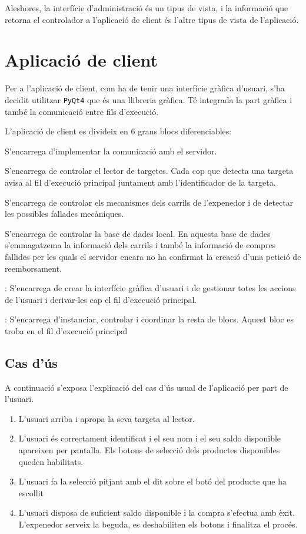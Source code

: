 Aleshores, la interfície d'administració és un tipus de vista, i la informació que retorna el controlador a l'aplicació de client és l'altre tipus de vista de l'aplicació.

\section{Aplicació de client}
Per a l'aplicació de client, com ha de tenir una interfície gràfica d'usuari, s'ha decidit utilitzar \texttt{PyQt4} que és una llibreria gràfica. Té integrada la part gràfica i també la comunicació entre fils d'execució.

L'aplicació de client es divideix en 6 grans blocs diferenciables:
\begin{description}[font=\normalfont\textbf]\itemsep2pt 
\vspace{-1em}
\parskip1pt 
\item[comms] S'encarrega d'implementar la comunicació amb el servidor.
\item[card\_reader] S'encarrega de controlar el lector de targetes. Cada cop que detecta una targeta avisa al fil d'execució principal juntament amb l'identificador de la targeta.
\item[column\_controller] S'encarrega de controlar els mecanismes dels carrils de l'expenedor i de detectar les possibles fallades mecàniques.
\item[db\_controller] S'encarrega de controlar la base de dades local. En aquesta base de dades s'emmagatzema la informació dels carrils i també la informació de compres fallides per les quals el servidor encara no ha confirmat la creació d'una petició de reemborsament.
\item[graphic\_ui]: S'encarrega de crear la interfície gràfica d'usuari i de gestionar totes les accions de l'usuari i derivar-les cap el fil d'execució principal.
\item[cocacolero]: S'encarrega d'instanciar, controlar i coordinar la resta de blocs. Aquest bloc es troba en el fil d'execució principal
\vspace{-1em}
\end{description}

\subsection{Cas d'ús}
A continuació s'exposa l'explicació del cas d'ús usual de l'aplicació per part de l'usuari.
\begin{enumerate}
\item L'usuari arriba i apropa la seva targeta al lector.
\item L'usuari és correctament identificat i el seu nom i el seu saldo disponible apareixen per pantalla. Els botons de selecció dels productes disponibles queden habilitats.
\item L'usuari fa la selecció pitjant amb el dit sobre el botó del producte que ha escollit
\item L'usuari disposa de suficient saldo disponible i la compra s'efectua amb èxit. L'expenedor serveix la beguda, es deshabiliten els botons i finalitza el procés.
\end{enumerate}

